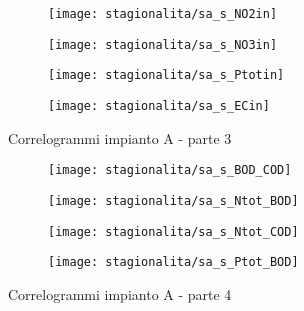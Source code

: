 \begin{sidewaysfigure}[h]\ContinuedFloat
	\renewcommand*\thesubfigure{(\arabic{subfigure})}
	\begin{subfigure}{0.49\textwidth}
		\texttt{[image: stagionalita/sa\_s\_NO2in]}
		\caption{}
		\centering
	\end{subfigure}
	\begin{subfigure}{0.49\textwidth}
		\texttt{[image: stagionalita/sa\_s\_NO3in]}
		\caption{}
		\centering
	\end{subfigure}

	\begin{subfigure}{0.49\textwidth}
		\texttt{[image: stagionalita/sa\_s\_Ptotin]}
		\caption{}
		\centering
	\end{subfigure}
	\begin{subfigure}{0.49\textwidth}
		\texttt{[image: stagionalita/sa\_s\_ECin]}	
		\caption{}
		\centering
	\end{subfigure}
	\caption{Correlogrammi impianto A - parte 3}
\end{sidewaysfigure}

\begin{sidewaysfigure}[h]\ContinuedFloat
	\renewcommand*\thesubfigure{(\arabic{subfigure})}
	\begin{subfigure}{0.49\textwidth}
		\texttt{[image: stagionalita/sa\_s\_BOD\_COD]}
		\caption{}
		\centering
	\end{subfigure}
	\begin{subfigure}{0.49\textwidth}
		\texttt{[image: stagionalita/sa\_s\_Ntot\_BOD]}
		\caption{}
		\centering
	\end{subfigure}

	\begin{subfigure}{0.49\textwidth}
		\texttt{[image: stagionalita/sa\_s\_Ntot\_COD]}
		\caption{}
		\centering
	\end{subfigure}
	\begin{subfigure}{0.49\textwidth}
		\texttt{[image: stagionalita/sa\_s\_Ptot\_BOD]}	
		\caption{}
		\centering
	\end{subfigure}
	\caption{Correlogrammi impianto A - parte 4}
\end{sidewaysfigure}

